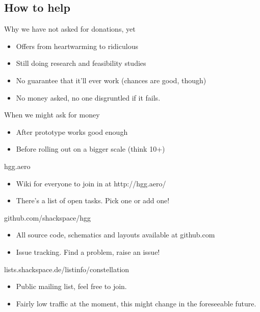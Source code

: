 \subsection{How to help}
	\begin{frame}{Why we have not asked for donations, yet}
		\begin{itemize}
			\item Offers from heartwarming to ridiculous
			\item Still doing research and feasibility studies
			\item No guarantee that it'll ever work (chances are good, though)
			\item No money asked, no one disgruntled if it fails.
		\end{itemize}
	\end{frame}
	\begin{frame}{When we might ask for money}
		\begin{itemize}
			\item After prototype works good enough
			\item Before rolling out on a bigger scale (think 10+)
		\end{itemize}
	\end{frame}
	\begin{frame}{hgg.aero}
		\begin{itemize}
			\item Wiki for everyone to join in at http://hgg.aero/
			\item There's a list of open tasks.  Pick one or add one!
		\end{itemize}
	\end{frame}
	\begin{frame}{github.com/shackspace/hgg}
		\begin{itemize}
			\item All source code, schematics and layouts available at github.com
			\item Issue tracking.  Find a problem, raise an issue!
		\end{itemize}
	\end{frame}
	\begin{frame}{lists.shackspace.de/listinfo/constellation}
		\begin{itemize}
			\item Public mailing list, feel free to join.
			\item Fairly low traffic at the moment, this might change in the foreseeable future.
		\end{itemize}
	\end{frame}



